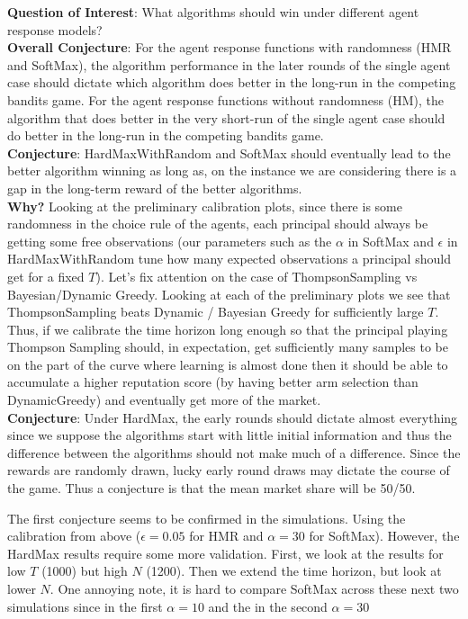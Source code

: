 \documentclass[11pt,letterpaper]{article}
\begin{document}
\textbf{Question of Interest}: What algorithms should win under different agent response models? \\
\textbf{Overall Conjecture}: For the agent response functions with randomness (HMR and SoftMax), the algorithm performance in the later rounds of the single agent case should dictate which algorithm does better in the long-run in the competing bandits game. For the agent response functions without randomness (HM), the algorithm that does better in the very short-run of the single agent case should do better in the long-run in the competing bandits game. \\
\textbf{Conjecture}: HardMaxWithRandom and SoftMax should eventually lead to the better algorithm winning as long as, on the instance we are considering there is a gap in the long-term reward of the better algorithms. \\
\textbf{Why?} Looking at the preliminary calibration plots, since there is some randomness in the choice rule of the agents, each principal should always be getting some free observations (our parameters such as the $\alpha$ in SoftMax and $\epsilon$ in HardMaxWithRandom tune how many expected observations a principal should get for a fixed $T$).  Let's fix attention on the case of ThompsonSampling vs Bayesian/Dynamic Greedy. Looking at each of the preliminary plots we see that ThompsonSampling beats Dynamic / Bayesian Greedy for sufficiently large $T$. Thus, if we calibrate the time horizon long enough so that the principal playing Thompson Sampling should, in expectation, get sufficiently many samples to be on the part of the curve where learning is almost done then it should be able to accumulate a higher reputation score (by having better arm selection than DynamicGreedy) and eventually get more of the market. \\

\textbf{Conjecture}: Under HardMax, the early rounds should dictate almost everything since we suppose the algorithms start with little initial information and thus the difference between the algorithms should not make much of a difference. Since the rewards are randomly drawn, lucky early round draws may dictate the course of the game. Thus a conjecture is that the mean market share will be 50/50.

The first conjecture seems to be confirmed in the simulations. Using the calibration from above ($\epsilon = 0.05$ for HMR and $\alpha = 30$ for SoftMax). However, the HardMax results require some more validation. First, we look at the results for low $T$ (1000) but high $N$ (1200). Then we extend the time horizon, but look at lower $N$. One annoying note, it is hard to compare SoftMax across these next two simulations since in the first $\alpha = 10$ and the in the second $\alpha = 30$
\end{document}
